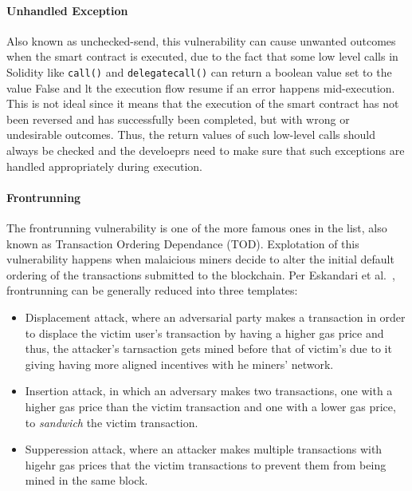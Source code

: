             \paragraph{Unhandled Exception}
            Also known as unchecked-send, this vulnerability  can cause unwanted outcomes when the smart contract is executed, due to the fact that some low level calls in Solidity like \texttt{call()} and \texttt{delegatecall()} can return a boolean value set to the value False and lt the execution flow resume if an error happens mid-execution.
            This is not ideal since it means that the execution of the smart contract has not been reversed and has successfully been completed, but with wrong or undesirable outcomes.
            Thus, the return values of such low-level calls should always be checked and the develoeprs need to make sure that such exceptions are handled appropriately during execution.
            
            \paragraph{Frontrunning}
            The frontrunning vulnerability is one of the more famous ones in the list, also known as Transaction Ordering Dependance (TOD).
            Explotation of this vulnerability happens when malaicious miners decide to alter the initial default ordering of the transactions submitted to the blockchain.
            Per Eskandari et al.~\cite{eskandari2018frontrunning}, frontrunning can be generally reduced into three templates:
            \begin{itemize}
                \item Displacement attack, where an adversarial party makes a transaction in order to displace the victim user's transaction by having a higher gas price and thus, the attacker's tarnsaction gets mined before that of victim's due to it giving having more aligned incentives with he miners' network.
                \item Insertion attack, in which an adversary makes two transactions, one with a higher gas price than the victim transaction and one with a lower gas price, to \textit{sandwich} the victim transaction.~\cite{varun2022mitigating}
                \item Supperession attack, where an attacker makes multiple transactions with higehr gas prices that the victim transactions to prevent them from being mined in the same block.
            \end{itemize}

